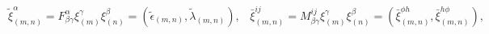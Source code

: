 \begin{equation}
\tilde{\xi}_{(m,n)}^{\alpha }=F_{\beta \gamma }^{\alpha }\xi _{(m)}^{\gamma
}\xi _{(n)}^{\beta }=(\tilde{\epsilon}_{(m,n)},\tilde{\lambda}%
_{(m,n)}),\;\;\;\bar{\xi}_{(m,n)}^{ij}=M_{\beta \gamma }^{ij}\xi
_{(m)}^{\gamma }\xi _{(n)}^{\beta }=(\bar{\xi}_{(m,n)}^{\phi h},\bar{\xi}%
_{(m,n)}^{h\phi }),  \label{param7}
\end{equation}

